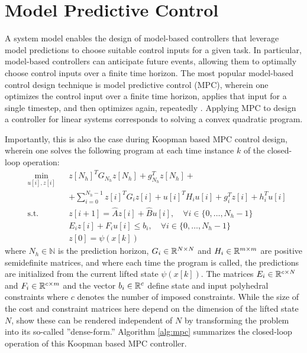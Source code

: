 \section{Model Predictive Control}
\label{sec:mpc}

A system model enables the design of model-based controllers that leverage model predictions to choose suitable control inputs for a given task.
In particular, model-based controllers can anticipate future events, allowing them to optimally choose control inputs over a finite time horizon.
The most popular model-based control design technique is model predictive control (MPC), wherein one optimizes the control input over a finite time horizon, applies that input for a single timestep, and then optimizes again, repeatedly \cite{rawlings2009model}.
Applying MPC to design a controller for linear systems corresponds to solving a convex quadratic program. 


Importantly, this is also the case during Koopman based MPC control design, wherein one solves the following program at each time instance $k$ of the closed-loop operation:
\begin{equation}
\begin{aligned}
& \underset{u[i] , z[i]}{\text{min}}
& & z[N_h]^{T} G_{N_h} z[N_h] + g_{N_h}^T z[N_h] +  \\
&&& + \sum_{i=0}^{N_h - 1} z[i]^T G_i z[i] + u[i]^T H_i u[i] + g_i^T z[i] + h_i^T u[i]\\
& \text{s.t.}
& & z[i+1] = \hat{A} z[i] + \hat{B} u[i] , \quad \forall i \in \{ 0 , \ldots , N_h - 1 \} \\
&&& E_i z[i] + F_i u[i] \leq b_i , \quad \forall i \in \{ 0 , \ldots , N_h - 1\} \\
&&& z[0] = \psi (x[k])
\end{aligned} \label{eq:mpc}
\end{equation}
where $N_h \in \mathbb{N}$ is the prediction horizon, $G_i \in \mathbb{R}^{N \times N}$ and $H_i \in \mathbb{R}^{m \times m}$ are positive semidefinite matrices, and where each time the program is called, the predictions are initialized from the current lifted state $\psi (x[k])$.
The matrices $E_i \in \mathbb{R}^{c \times N}$ and $F_i \in \mathbb{R}^{c \times m}$ and the vector $b_i \in \mathbb{R}^{c}$ define state and input polyhedral constraints where $c$ denotes the number of imposed constraints.
While the size of the cost and constraint matrices here depend on the dimension of the lifted state $N$, \citet{korda2018linear} show these can be rendered independent of $N$ by transforming the problem into its so-called ''dense-form.''
Algorithm \ref{alg:mpc} summarizes the closed-loop operation of this Koopman based MPC controller.

